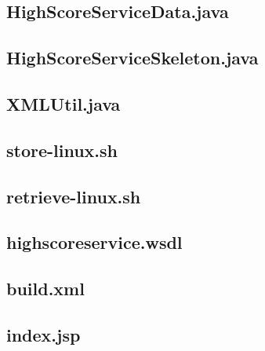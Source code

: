 \documentclass[a4paper, 12pt]{article}
\begin{document}
\newpage
\subsection{HighScoreServiceData.java}\label{HighScoreServiceData.java}
\begin{footnotesize}
  
\end{footnotesize}

\newpage
\subsection{HighScoreServiceSkeleton.java}\label{HighScoreServiceSkeleton.java}
\begin{footnotesize}
  
\end{footnotesize}

\newpage
\subsection{XMLUtil.java}\label{XMLUtil.java}
\begin{footnotesize}
  
\end{footnotesize}

\newpage
\subsection{store-linux.sh}\label{store-linux.sh}
\begin{footnotesize}
  
\end{footnotesize}

\newpage
\subsection{retrieve-linux.sh}\label{etrieve-linux.sh}
\begin{footnotesize}
  
\end{footnotesize}

\newpage
\subsection{highscoreservice.wsdl}\label{highscoreservice.wsdl}
\begin{footnotesize}
  
\end{footnotesize}

\newpage
\subsection{build.xml}\label{build.xml}
\begin{footnotesize}
  
\end{footnotesize}

\newpage
\subsection{index.jsp}\label{index.jsp}
\begin{footnotesize}
  
\end{footnotesize}
\end{document}
